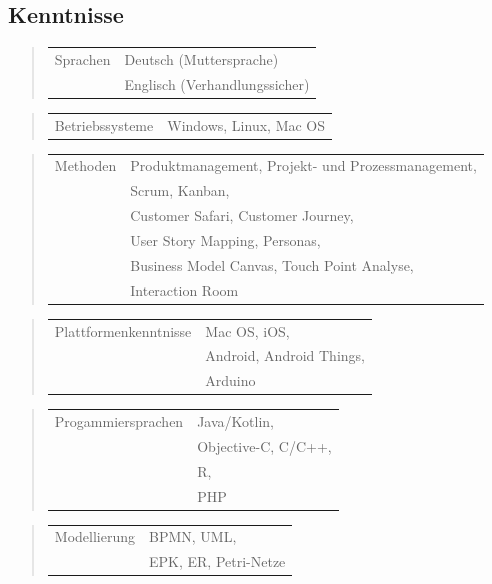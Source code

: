 \subsection*{Kenntnisse}
%
\ifshowKenntnisseSprachen
\begin{quote}
	\begin{tabular}{p{4cm}l}
		Sprachen&Deutsch (Muttersprache)\\
		&Englisch (Verhandlungssicher)\\
	\end{tabular}
\end{quote}
\fi
%
\ifshowKenntnisseOS
\begin{quote}
	\begin{tabular}{p{4cm}l}
		Betriebssysteme&Windows, Linux, Mac OS
	\end{tabular}
\end{quote}
\fi
%
\ifshowKenntnisseMethoden
\begin{quote}
	\begin{tabular}{p{4cm}l}
		Methoden&Produktmanagement, Projekt- und Prozessmanagement,\\
		&Scrum, Kanban,\\
		&Customer Safari, Customer Journey,\\
		&User Story Mapping, Personas,\\
		&Business Model Canvas, Touch Point Analyse,\\
		&Interaction Room
	\end{tabular}
\end{quote}
\fi
\ifshowKenntnissePlattformen
\begin{quote}
	\begin{tabular}{p{4cm}l}
		Plattformenkenntnisse&Mac OS, iOS,\\
		&Android, Android Things,\\
		&Arduino
	\end{tabular}
\end{quote}
\fi
%
\ifshowKenntnisseProgSpr
\begin{quote}
	\begin{tabular}{p{4cm}l}
			Progammiersprachen&Java/Kotlin,\\
			&Objective-C, C/C++,\\
			&R,\\
			&PHP
		\end{tabular}
	\end{quote}
\begin{quote}
	\begin{tabular}{p{4cm}l}
			Modellierung&BPMN, UML,\\
			&EPK, ER, Petri-Netze
		\end{tabular}
	\end{quote}
